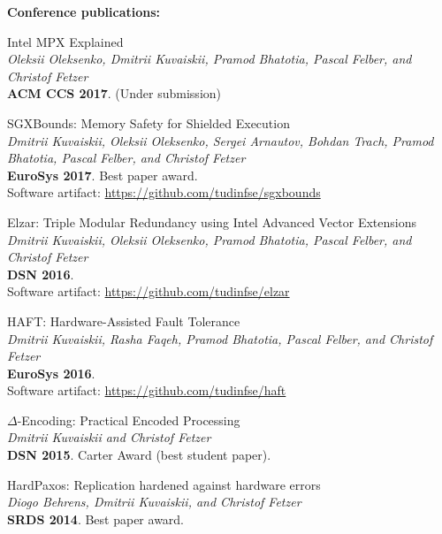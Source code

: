 \documentclass[letterpaper]{article}
\renewenvironment{itemize}{
  \begin{list}{}{
    \setlength{\leftmargin}{1.5em}
  }
}{
  \end{list}
}
\begin{document}
{\bf Conference publications:}
\begin{itemize}

\item Intel MPX Explained\\
{\em Oleksii Oleksenko, {Dmitrii Kuvaiskii}, Pramod Bhatotia,  Pascal Felber, and Christof Fetzer}\\
{\bf ACM CCS 2017}. (Under submission)

\item SGXBounds: Memory Safety for Shielded Execution\\
{\em Dmitrii Kuvaiskii, Oleksii Oleksenko, Sergei Arnautov, Bohdan Trach, Pramod Bhatotia, Pascal Felber, and Christof Fetzer}\\
{\bf  EuroSys 2017}. Best paper award.\\
Software artifact: \href{https://github.com/tudinfse/sgxbounds}{https://github.com/tudinfse/sgxbounds}

\item Elzar: Triple Modular Redundancy using Intel Advanced Vector Extensions\\
{\em Dmitrii Kuvaiskii, Oleksii Oleksenko, Pramod Bhatotia, Pascal Felber, and  Christof Fetzer}\\
{\bf  DSN 2016}.\\
Software artifact: \href{https://github.com/tudinfse/elzar}{https://github.com/tudinfse/elzar}

\item HAFT: Hardware-Assisted Fault Tolerance\\
{\em Dmitrii Kuvaiskii, Rasha Faqeh, Pramod Bhatotia, Pascal Felber, and  Christof Fetzer}\\
{\bf  EuroSys 2016}.\\
Software artifact: \href{https://github.com/tudinfse/haft}{https://github.com/tudinfse/haft}

\item $\Delta$-Encoding: Practical Encoded Processing\\
{\em Dmitrii Kuvaiskii and Christof Fetzer}\\
{\bf   DSN 2015}. Carter Award (best student paper).


\item HardPaxos: Replication hardened against hardware errors\\
{\em Diogo Behrens, {Dmitrii Kuvaiskii}, and Christof Fetzer}\\
{\bf SRDS 2014}. Best paper award.

\end{itemize}
\end{document}
